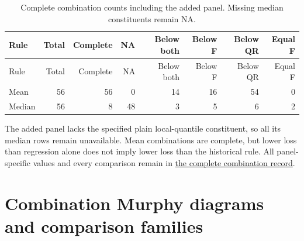 \documentclass[11pt,a4paper]{article}
\begin{document}
\begingroup
\scriptsize
\setlength{\tabcolsep}{3pt}
\renewcommand{\arraystretch}{1.12}
\begin{longtable}{lrrrrrrr}
\caption{Complete combination counts including the added panel. Missing median constituents remain NA.}\\
\toprule
Rule & Total & Complete & NA & Below both & Below F & Below QR & Equal F \\
\midrule
\endfirsthead
\toprule
Rule & Total & Complete & NA & Below both & Below F & Below QR & Equal F \\
\midrule
\endhead
\bottomrule
\endfoot
Mean & 56 & 56 & 0 & 14 & 16 & 54 & 0 \\
Median & 56 & 8 & 48 & 3 & 5 & 6 & 2 \\
\end{longtable}
\endgroup

The added panel lacks the specified plain local-quantile
constituent, so all its median rows remain unavailable. Mean combinations are
complete, but lower loss than regression alone does not imply lower loss than
the historical rule. All panel-specific values and every comparison remain in
\href{https://github.com/ByronLi0207/financial-mathematics-paper-20261020/blob/revision-v7-final/results/revision-20261023/v6/wp3-combinations.json}{the complete combination record}.\section{Combination Murphy diagrams and comparison families}\label{sup:wp3-murphy}
\end{document}
